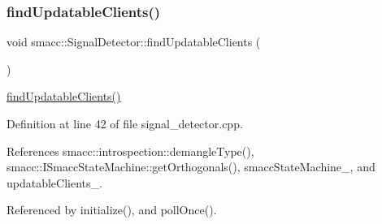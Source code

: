 \subsubsection{\texorpdfstring{find\+Updatable\+Clients()}{findUpdatableClients()}}
{\footnotesize\ttfamily void smacc\+::\+Signal\+Detector\+::find\+Updatable\+Clients (\begin{DoxyParamCaption}{ }\end{DoxyParamCaption})\hspace{0.3cm}{\ttfamily [private]}}

\hyperlink{classsmacc_1_1SignalDetector_a47ec2df560e2e33758ce3975bece9385}{find\+Updatable\+Clients()} 

Definition at line 42 of file signal\+\_\+detector.\+cpp.



References smacc\+::introspection\+::demangle\+Type(), smacc\+::\+I\+Smacc\+State\+Machine\+::get\+Orthogonals(), smacc\+State\+Machine\+\_\+, and updatable\+Clients\+\_\+.



Referenced by initialize(), and poll\+Once().


